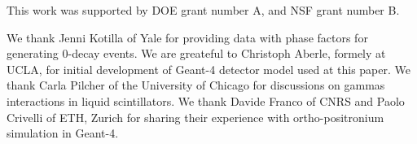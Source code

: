 This work was supported by DOE grant number A, and NSF grant number B.

We thank Jenni Kotilla of Yale for providing data with phase factors for generating 0\nbb-decay events.
We are greateful to Christoph Aberle, formely at UCLA, for initial development of Geant-4 
detector model used at this paper. We thank Carla Pilcher of 
the University of Chicago for discussions on gammas interactions in liquid scintillators.
We thank Davide Franco of CNRS and Paolo Crivelli of ETH, Zurich for sharing their experience with ortho-positronium 
simulation in Geant-4. 
